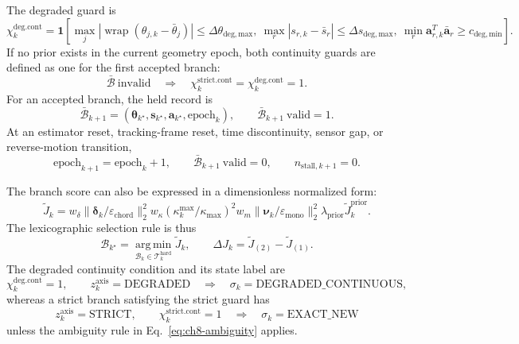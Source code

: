 \documentclass[12pt,a4paper]{report}
\begin{document}
The degraded guard is
\begin{equation}
\chi_k^{\mathrm{deg.cont}}
=\mathbf{1}\!\left[
\max_j|\operatorname{wrap}(\theta_{j,k}-\bar\theta_j)|
\leq\Delta\theta_{\mathrm{deg,max}},\
\max_r|s_{r,k}-\bar s_r|
\leq\Delta s_{\mathrm{deg,max}},\
\min_r\mathbf{a}_{r,k}^{T}\bar{\mathbf{a}}_r
\geq c_{\mathrm{deg,min}}
\right].
\tag{8.133}
\label{eq:ch8-degraded-continuity}
\end{equation}
If no prior exists in the current geometry epoch, both continuity guards are
defined as one for the first accepted branch:
\begin{equation}
\bar{\mathcal{B}}\ \text{invalid}
\quad\Longrightarrow\quad
\chi_k^{\mathrm{strict.cont}}
=\chi_k^{\mathrm{deg.cont}}=1 .
\tag{8.134}
\label{eq:ch8-first-branch-continuity}
\end{equation}
For an accepted branch, the held record is
\begin{equation}
\bar{\mathcal{B}}_{k+1}
=\left(\boldsymbol{\theta}_{k^\star},
\mathbf{s}_{k^\star},\mathbf{a}_{k^\star},
\mathrm{epoch}_{k}\right),
\qquad
\bar{\mathcal{B}}_{k+1}\ \text{valid}=1.
\tag{8.135}
\label{eq:ch8-held-record}
\end{equation}
At an estimator reset, tracking-frame reset, time discontinuity, sensor gap,
or reverse-motion transition,
\begin{equation}
\mathrm{epoch}_{k+1}=\mathrm{epoch}_{k}+1,\qquad
\bar{\mathcal{B}}_{k+1}\ \text{valid}=0,\qquad
n_{\mathrm{stall},k+1}=0 .
\tag{8.136}
\label{eq:ch8-epoch-reset}
\end{equation}

The branch score can also be expressed in a dimensionless normalized form:
\begin{equation}
\widetilde J_k=
w_\delta\|\boldsymbol{\delta}_k/
\varepsilon_{\mathrm{chord}}\|_2^2
w_\kappa(\kappa_k^{\max}/\kappa_{\max})^2
w_m\|\boldsymbol{\nu}_k/\varepsilon_{\mathrm{mono}}\|_2^2
\lambda_{\mathrm{prior}}\widetilde J_k^{\mathrm{prior}} .
\tag{8.137}
\label{eq:ch8-normalized-score}
\end{equation}
The lexicographic selection rule is thus
\begin{equation}
\mathcal{B}_{k^\star}
=\operatorname*{arg\,min}_{\mathcal{B}_k\in
\mathcal{T}^{\mathrm{hard}}_k}\widetilde J_k,
\qquad
\Delta J_k=\widetilde J_{(2)}-\widetilde J_{(1)}.
\tag{8.138}
\label{eq:ch8-lexicographic-selection}
\end{equation}
The degraded continuity condition and its state label are
\begin{equation}
\chi_k^{\mathrm{deg.cont}}=1,\qquad
z_k^{\mathrm{axis}}=\mathrm{DEGRADED}
\quad\Longrightarrow\quad
\sigma_k=\mathrm{DEGRADED\_CONTINUOUS},
\tag{8.139}
\label{eq:ch8-degraded-state}
\end{equation}
whereas a strict branch satisfying the strict guard has
\begin{equation}
z_k^{\mathrm{axis}}=\mathrm{STRICT},\qquad
\chi_k^{\mathrm{strict.cont}}=1
\quad\Longrightarrow\quad
\sigma_k=\mathrm{EXACT\_NEW}
\tag{8.140}
\label{eq:ch8-strict-state}
\end{equation}
unless the ambiguity rule in Eq.~\eqref{eq:ch8-ambiguity} applies.
\end{document}
